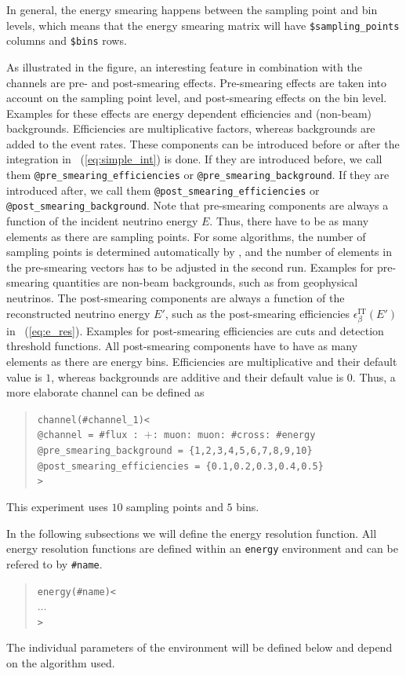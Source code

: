 In general, the energy smearing happens between the sampling point and bin levels, which means that the energy smearing matrix will have {\tt \$sampling\_points} columns and {\tt \$bins} rows. 

As illustrated in the figure, an interesting feature in combination with the
channels are pre- and post-smearing effects. Pre-smearing effects are taken into account on the sampling point level, and post-smearing effects on the bin level. Examples for these effects are energy 
dependent efficiencies and (non-beam) backgrounds. Efficiencies are multiplicative factors, whereas backgrounds are added to the event rates. These components can be introduced before or after the integration in \eq~(\ref{eq:simple_int}) is done. If they are introduced before, 
we call them
{\tt @pre\_smearing\_efficiencies} or {\tt @pre\_smearing\_background}. 
If they are introduced after, we call them {\tt @post\_smearing\_efficiencies} or {\tt @post\_smearing\_background}.
Note that pre-smearing components are always a function of the incident neutrino energy $E$. Thus, there have to be as  many elements as there are sampling points. For some algorithms, the number of sampling points is determined automatically by \GLOBES , and the number of elements in the  pre-smearing vectors has to be adjusted in the second run.
Examples for pre-smearing quantities are non-beam backgrounds, such as from geophysical neutrinos. The post-smearing components are always a function of the reconstructed neutrino energy $E'$, such as the post-smearing efficiencies $\epsilon_\beta^{\text{IT}}(E')$ in \eq~(\ref{eq:e_res}). Examples for post-smearing efficiencies are cuts and detection threshold functions. All post-smearing components have to have as 
many elements as there are energy bins. Efficiencies are multiplicative 
and their default value is $1$, whereas backgrounds are additive and their default value is $0$. Thus, a more elaborate channel can be defined as
\begin{quote}
{\tt channel(\#channel\_1)<\\
\tb @channel = \#flux : $+$: muon: muon: \#cross: \#energy\\
\tb @pre\_smearing\_background = \{1,2,3,4,5,6,7,8,9,10\}\\
\tb @post\_smearing\_efficiencies = \{0.1,0.2,0.3,0.4,0.5\}\\
>}
\end{quote}
This experiment uses $10$ sampling points and $5$ bins.

In the following subsections we will define the energy resolution function.
All energy resolution functions are defined within an {\tt energy} environment and can be refered to by {\tt \#name}.
\begin{quote}
  {\tt energy(\#name)<\\
\tb $\ldots$\\
>}
\end{quote}
The individual parameters of the environment will be defined below and depend on the algorithm used.

